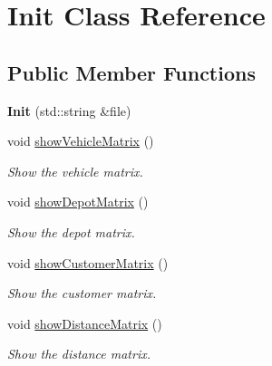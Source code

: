 \hypertarget{class_init}{}\section{Init Class Reference}
\label{class_init}
\subsection*{Public Member Functions}
\begin{DoxyCompactItemize}
\item 
\mbox{\label{class_init_aae03d6a60f73f959014c6078fde9cd8c}} 
{\bfseries Init} (std\+::string \&file)
\item 
\mbox{\label{class_init_ac21ef408e896d9eceee8455fe51845b0}} 
void \hyperlink{class_init_ac21ef408e896d9eceee8455fe51845b0}{show\+Vehicle\+Matrix} ()
\begin{DoxyCompactList}\small\item\em Show the vehicle matrix. \end{DoxyCompactList}\item 
\mbox{\label{class_init_ae48e74d855e16384caf464dd27f6edee}} 
void \hyperlink{class_init_ae48e74d855e16384caf464dd27f6edee}{show\+Depot\+Matrix} ()
\begin{DoxyCompactList}\small\item\em Show the depot matrix. \end{DoxyCompactList}\item 
\mbox{\label{class_init_a977b73b6cde475c66a77da062a4fb847}} 
void \hyperlink{class_init_a977b73b6cde475c66a77da062a4fb847}{show\+Customer\+Matrix} ()
\begin{DoxyCompactList}\small\item\em Show the customer matrix. \end{DoxyCompactList}\item 
\mbox{\label{class_init_a6a0c2ee0902aba32df707db9bce7d1d5}} 
void \hyperlink{class_init_a6a0c2ee0902aba32df707db9bce7d1d5}{show\+Distance\+Matrix} ()
\begin{DoxyCompactList}\small\item\em Show the distance matrix. \end{DoxyCompactList}\item 

\end{DoxyCompactItemize}
